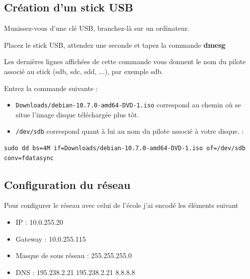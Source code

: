 \documentclass[12pt,a4paper]{article}
\newcommand{\code}[1]{\colorbox{light-gray}{\texttt{#1}}}
\begin{document}
\begin{flushleft}
       \subsection{Création d'un stick USB}
       \item Munissez-vous d'une clé USB, branchez-là sur un ordinateur.
       \item Placez le stick USB, attendez une seconde et tapez la commande \textbf{dmesg}
       \item Les dernières lignes affichées de cette commande vous donnent le nom du pilote associé au stick (sdb,
sdc, sdd, ...), par exemple sdb.
        \item Entrez la commande suivante : 
        \begin{itemize}
            \item \code{Downloads/debian-10.7.0-amd64-DVD-1.iso} correspond au chemin où se situe l'image disque téléchargée plus tôt. 
            \item \code{/dev/sdb} correspond quant à lui au nom du pilote associé à votre disque. : 
        \end{itemize}
        \begin{lstlisting}
sudo dd bs=4M if=Downloads/debian-10.7.0-amd64-DVD-1.iso of=/dev/sdb conv=fdatasync
        \end{lstlisting}
        

       \subsection{Configuration du réseau}
       \item Pour configurer le réseau avec celui de l'école j'ai encodé les éléments suivant
       \begin{itemize}
           \item IP : 10.0.255.20
           \item Gateway : 10.0.255.115
           \item Masque de sous réseau : 255.255.255.0
           \item DNS : 195.238.2.21 195.238.2.21 8.8.8.8
       \end{itemize}

\end{flushleft}
\end{document}
